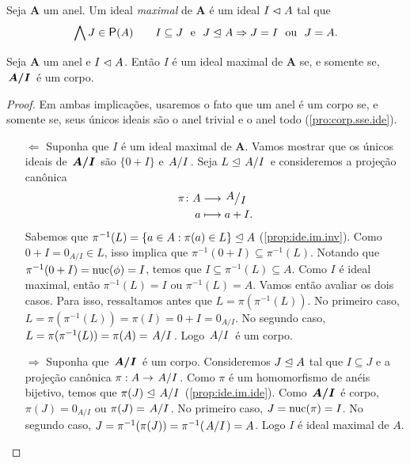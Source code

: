 \begin{definition}
	Seja $\bm A$ um anel. Um ideal \emph{maximal} de $\bm A$ é um ideal $I \mathrel{\lhd} A$ tal que
	\begin{equation*}
	\forall J \in \p(A) \qquad I \subseteq J \text{\ \ e\ \ } J \ide A \Rightarrow J = I \text{\ \ ou\ \ } J = A.
	\end{equation*}
\end{definition}

\begin{theorem}
\label{teo:ide.max.cor}
	Seja $\bm A$ um anel e $I \mathrel{\lhd} A$. Então $I$ é um ideal maximal de $\bm A$ se, e somente se, $\bm{\quo{A}{I}}$ é um corpo.
\end{theorem}
\begin{proof} Em ambas implicações, usaremos o fato que um anel é um corpo se, e somente se, seus únicos ideais são o anel trivial e o anel todo (\ref{pro:corp.sse.ide}).
	\begin{enumerate}
	\item[$\Leftarrow$] Suponha que $I$ é um ideal maximal de $\bm A$.  Vamos mostrar que os únicos ideais de $\bm{\quo{A}{I}}$ são $\{0+I\}$ e $\quo{A}{I}$. Seja $L \ide \quo{A}{I}$ e consideremos a projeção canônica
	\begin{align*}
	\func{\pi}{A}{\quo{A}{I}}{a}{a+I.}
	\end{align*}
Sabemos que $\pi^{-1}(L)=\{a \in A : \pi(a) \in L\} \mathrel{\unlhd} A$ (\ref{prop:ide.im.inv}). Como $0+I=0_{A/I} \in L$, isso implica que $\pi^{-1}(0+I) \subseteq \pi^{-1}(L)$. Notando que $\pi^{-1}(0+I)=\operatorname{nuc}(\phi)=I$, temos que $I \subseteq \pi^{-1}(L) \subseteq A$. Como $I$ é ideal maximal, então $\pi^{-1}(L)=I$ ou $\pi^{-1}(L)=A$. Vamos então avaliar os dois casos. Para isso, ressaltamos antes que $L=\pi(\pi^{-1}(L))$. No primeiro caso, $L=\pi(\pi^{-1}(L))=\pi(I)=0+I=0_{A/I}$. No segundo caso, $L=\pi(\pi^{-1}(L))=\pi(A)=\quo{A}{I}$. Logo $\quo{A}{I}$ é um corpo.
	\item[$\Rightarrow$] Suponha que $\bm{\quo{A}{I}}$ é um corpo. Consideremos $J \mathrel{\unlhd} A$ tal que $I \subseteq J$ e a projeção canônica $\pi: A \to \quo{A}{I}$. Como $\pi$ é um homomorfismo de anéis bijetivo, temos que $\pi(J) \ide \quo{A}{I}$ (\ref{prop:ide.im.ide}). Como $\bm{\quo{A}{I}}$ é corpo, $\pi(J)={0_{A/I}}$ ou $\pi(J)=\quo{A}{I}$. No primeiro caso, $J=\operatorname{nuc}(\pi)=I$. No segundo caso, $J=\pi^{-1}(\pi(J))=\pi^{-1}(\quo{A}{I})=A$. Logo $I$ é ideal maximal de $A$.
	\qedhere
	\end{enumerate}
\end{proof}

